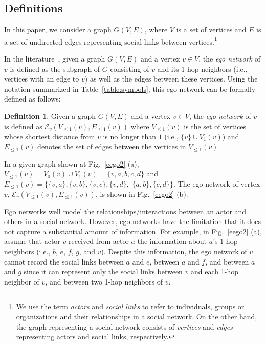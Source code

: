 \documentclass[preprint,12pt,authoryear]{elsarticle}
\newcommand{\V}[2]{V_{#2}({#1})}
\newcommand{\LV}[2]{V_{\le #2}({#1})}
\newcommand{\LE}[2]{E_{\le #2}({#1})}
\newcommand{\EN}[1]{\mathcal{E}_{{#1}}}
\theoremstyle{definition}
\newtheorem{definition}{Definition}[section]
\begin{document}
\subsection{Definitions}\label{x-ego_definition}
In this paper, we consider a graph $G(V, E)$, where $V$ is a set of vertices and $E$ is a set of undirected edges representing social links between vertices.\footnote{We use the term {\em actors} and {\em social links} to refer to individuals, groups or organizations and their relationships in a social network. On the other hand, the graph representing a social network consists of {\em vertices} and {\em edges} representing actors and social links, respectively.}

In the literature~\cite{egocentric, everett, ICCN:lbcdna, SIMBET}, given a graph $G(V, E)$ and a vertex $v \in V$, the {\em ego network} of $v$ is defined as the subgraph of $G$ consisting of $v$ and its 1-hop neighbors (i.e., vertices with an edge to $v$) as well as the edges between these vertices.
Using the notation summarized in Table~\ref{table:symbols}, this ego network can be formally defined as follows:

\begin{definition}\label{def:ego-network}
Given a graph $G(V, E)$ and a vertex $v \in V$, the \emph{ego network} of $v$ is defined as $\EN{v} (\LV{v}{1}, \LE{v}{1})$ where $\LV{v}{1}$ is the set of vertices whose shortest distance from $v$ is no longer than $1$ (i.e., $\{ v \} \cup \V{v}{1}$) and $\LE{v}{1}$ denotes the set of edges between the vertices in $\LV{v}{1}$.
\end{definition}

In a given graph shown at Fig.~\ref{eego2} (a), $\LV{v}{1} = \V{v}{0} \cup \V{v}{1} = \{v, a, b, c, d\}$ and $\LE{v}{1}=\{ \{v, a\}, \{v, b\}, \{v, c\}, \{v, d\},$ $\{a, b\}, \{c, d\} \}$.
The ego network of vertex $v$, $\EN{v}(\LV{v}{1}, \LE{v}{1})$, is shown in Fig.~\ref{eego2} (b).

Ego networks well model the relationships/interactions between an actor and others in a social network.
However, ego networks have the limitation that it does not capture a substantial amount of information.
For example, in Fig.~\ref{eego2} (a), assume that actor $v$ received from actor $a$ the information about $a$'s 1-hop neighbors (i.e., $b$, $e$, $f$, $g$, and $v$).
Despite this information, the ego network of $v$ cannot record the social links between $a$ and $e$, between $a$ and $f$, and between $a$ and $g$ since it can represent only the social links between $v$ and each 1-hop neighbor of $v$, and between two 1-hop neighbors of $v$. 
\end{document}
